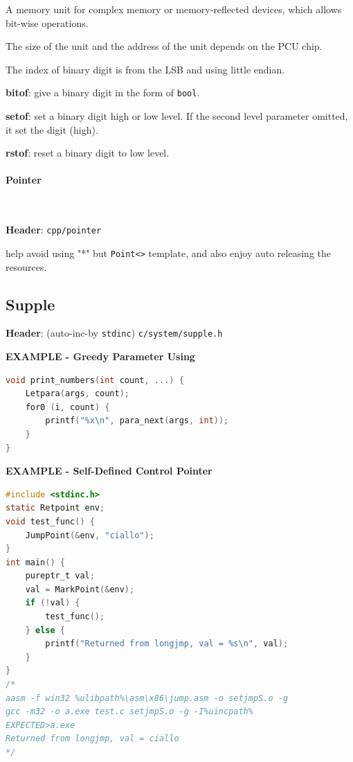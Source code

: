 A memory unit for complex memory or memory-reflected devices, which allows bit-wise operations.

The size of the unit and the address of the unit depends on the PCU chip.

The index of binary digit is from the LSB and using little endian.

\textbf{bitof}: give a binary digit in the form of \verb|bool|. 

\textbf{setof}: set a binary digit high or low level. If the second level parameter omitted, it set the digit (high).

\textbf{rstof}: reset a binary digit to low level.



\paragraph{Pointer} \

\textbf{Header}: \verb|cpp/pointer|

help avoid using "*" but \verb|Point<>| template, and also enjoy auto releasing the resources.



\subsection{Supple}

\textbf{Header}: (auto-inc-by \verb|stdinc|) \verb|c/system/supple.h|

\textbf{EXAMPLE - Greedy Parameter Using}

\begin{lstlisting}[language=C]
void print_numbers(int count, ...) {
	Letpara(args, count);
	for0 (i, count) {
		printf("%x\n", para_next(args, int));
	}
}
\end{lstlisting}

\textbf{EXAMPLE - Self-Defined Control Pointer}

\begin{lstlisting}[language=C]
#include <stdinc.h>
static Retpoint env;
void test_func() {
	JumpPoint(&env, "ciallo");
}
int main() {
	pureptr_t val;
	val = MarkPoint(&env);
	if (!val) {
		test_func();
	} else {
		printf("Returned from longjmp, val = %s\n", val);
	}
}
/*
aasm -f win32 %ulibpath%\asm\x86\jump.asm -o setjmpS.o -g
gcc -m32 -o a.exe test.c setjmpS.o -g -I%uincpath%
EXPECTED>a.exe
Returned from longjmp, val = ciallo
*/
\end{lstlisting}

